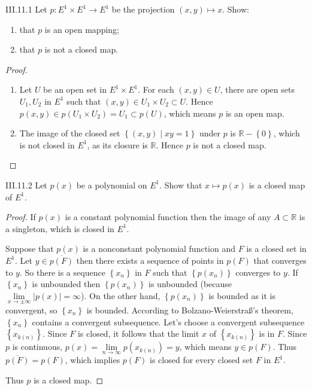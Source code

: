 \begin{problem}{III.11.1}
Let \( p: E^{1} \times E^{1} \to E^{1} \) be the projection \( (x, y) \mapsto x \). Show:
\begin{enumerate}[label={(\alph*)}]
    \item that \(p\) is an open mapping;
    \item that \(p\) is not a closed map.
\end{enumerate}
\end{problem}

\begin{proof}
    \begin{enumerate}[label={(\alph*)}]
        \item Let \( U \) be an open set in \( E^{1} \times E^{1} \). For each \( (x, y) \in U \), there are open sets \( U_{1}, U_{2} \) in \( E^{1} \) such that \( (x, y) \in U_{1} \times U_{2} \subset U \). Hence \( p(x, y) \in p(U_{1} \times U_{2}) = U_{1} \subset p(U) \), which means \( p \) is an open map.

        \item The image of the closed set \( \left\{ (x, y) \mid xy = 1 \right\} \) under \(p\) is \( \mathbb{R} - \left\{0\right\} \), which is not closed in \( E^{1} \), as its closure is \( \mathbb{R} \). Hence \(p\) is not a closed map.
    \end{enumerate}
\end{proof}

\begin{problem}{III.11.2}
Let \( p(x) \) be a polynomial on \(E^{1}\). Show that \( x \mapsto p(x) \) is a closed map of \( E^{1} \).
\end{problem}

\begin{proof}
    If \( p(x) \) is a constant polynomial function then the image of any \( A \subset \mathbb{R} \) is a singleton, which is closed in \( E^{1} \).

    Suppose that \( p(x) \) is a nonconstant polynomial function and \( F \) is a closed set in \( E^{1} \). Let \( y \in \overline{p(F)} \) then there exists a sequence of points in \( p(F) \) that converges to \( y \). So there is a sequence \( \left\{ x_{n} \right\} \) in \( F \) such that \( \left\{ p(x_{n}) \right\} \) converges to \( y \). If \( \left\{ x_{n} \right\} \) is unbounded then \( \left\{ p(x_{n}) \right\} \) is unbounded (because \( \lim\limits_{x\to\pm\infty} \left\vert p(x) \right\vert = \infty \)). On the other hand, \( \left\{ p(x_{n}) \right\} \) is bounded as it is convergent, so \( \left\{ x_{n} \right\} \) is bounded. According to Bolzano-Weierstra\ss's theorem, \( \left\{ x_{n} \right\} \) contains a convergent subsequence. Let's choose a convergent subsequence \( \left\{ x_{k(n)} \right\} \). Since \( F \) is closed, it follows that the limit \( x \) of \( \left\{ x_{k(n)} \right\} \) is in \( F \). Since \( p \) is continuous, \( p(x) = \lim\limits_{n\to\infty} p(x_{k(n)}) = y \), which means \( y \in p(F) \). Thus \( \overline{p(F)} = p(F) \), which implies \( p(F) \) is closed for every closed set \( F \) in \( E^{1} \).

    Thus \( p \) is a closed map.
\end{proof}

